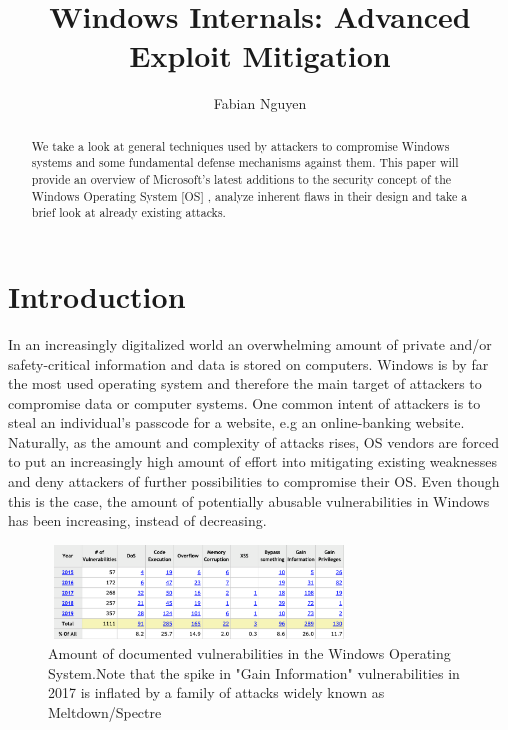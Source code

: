 \documentclass[10pt,twocolumn,a4paper]{article}
\author{Fabian Nguyen}
\begin{document}
\title{ Windows Internals: Advanced Exploit Mitigation }

\newcommand{\todo}[1]{{\texttt{[#1]}}}
\newcommand{\code}[1]{{\tt \small{#1}}}

\maketitle

\begin{abstract}
We take a look at general techniques used by attackers to compromise Windows systems and some fundamental defense mechanisms against them.
This paper will provide an overview of Microsoft's latest additions to the security concept of the Windows Operating System [OS] , analyze inherent flaws in their design and take a brief look at already existing attacks. 
\end{abstract}

\section{Introduction}\label{sec:introduction}
In an increasingly digitalized world an overwhelming amount of private and/or safety-critical information and data is stored on computers.
Windows is by far the most used operating system and therefore the main target of attackers to compromise data or computer systems.
One common intent of attackers is to steal an individual's passcode for a website, e.g an online-banking website.
Naturally, as the amount and complexity of attacks rises, OS vendors are forced to put an increasingly high amount of effort into mitigating existing weaknesses and deny attackers of further possibilities to compromise their OS.
Even though this is the case, the amount of potentially abusable vulnerabilities in Windows has been increasing, instead of decreasing.

\begin{figure}[htbp]
\includegraphics[width=8cm, height=2.5cm]{fig/stats}
\caption{Amount of documented vulnerabilities in the Windows Operating System.\newline Note that the spike in "Gain Information" vulnerabilities in 2017 is inflated by a family of attacks widely known as Meltdown/Spectre}
\end{figure}
\end{document}
